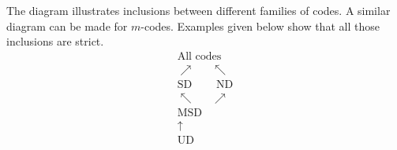 \documentclass[final,nomarks]{dmtcs-episciences}
\begin{document}
The diagram illustrates inclusions between different families of codes. 
A similar diagram can be made for $m$-codes.
Examples given below show that all those inclusions are strict.
\begin{displaymath}
\begin{array}{c}
\mbox{All codes}\\
\nearrow~~~~~~~\nwarrow\\
\mbox{SD}~~~~~~~~~~\mbox{ND}\\
\nwarrow~~~~~~~\nearrow \\
\mbox{MSD}\\
\uparrow\\
\mbox{UD}
\end{array}
\end{displaymath}
\end{document}
